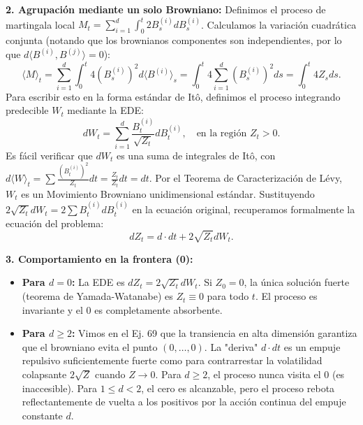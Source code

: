 \documentclass[11pt, letterpaper]{article}
\begin{document}
\begin{solucion}
    \textbf{2. Agrupación mediante un solo Browniano:}
    Definimos el proceso de martingala local $M_t = \sum_{i=1}^d \int_0^t 2 B_s^{(i)} dB_s^{(i)}$.
    Calculamos la variación cuadrática conjunta (notando que los brownianos componentes son independientes, por lo que $d\langle B^{(i)}, B^{(j)} \rangle = 0$):
    \[ \langle M \rangle_t = \sum_{i=1}^d \int_0^t 4 (B_s^{(i)})^2 d\langle B^{(i)} \rangle_s = \int_0^t 4 \sum_{i=1}^d (B_s^{(i)})^2 ds = \int_0^t 4 Z_s ds. \]
    Para escribir esto en la forma estándar de Itô, definimos el proceso integrando predecible $W_t$ mediante la EDE:
    \[ dW_t = \sum_{i=1}^d \frac{B_t^{(i)}}{\sqrt{Z_t}} dB_t^{(i)}, \quad \text{en la región } Z_t > 0. \]
    Es fácil verificar que $dW_t$ es una suma de integrales de Itô, con $d\langle W \rangle_t = \sum \frac{(B_t^{(i)})^2}{Z_t} dt = \frac{Z_t}{Z_t} dt = dt$.
    Por el Teorema de Caracterización de Lévy, $W_t$ es un Movimiento Browniano unidimensional estándar.
    Sustituyendo $2\sqrt{Z_t} dW_t = 2 \sum B_t^{(i)} dB_t^{(i)}$ en la ecuación original, recuperamos formalmente la ecuación del problema:
    \[ dZ_t = d \cdot dt + 2 \sqrt{Z_t} dW_t. \]

    \textbf{3. Comportamiento en la frontera (0):}
    \begin{itemize}
        \item \textbf{Para $d=0$:} La EDE es $dZ_t = 2\sqrt{Z_t}dW_t$. Si $Z_0 = 0$, la única solución fuerte (teorema de Yamada-Watanabe) es $Z_t \equiv 0$ para todo $t$. El proceso es invariante y el 0 es completamente absorbente.
        \item \textbf{Para $d \ge 2$:} Vimos en el Ej. 69 que la transiencia en alta dimensión garantiza que el browniano evita el punto $(0, \dots, 0)$. La "deriva" $d \cdot dt$ es un empuje repulsivo suficientemente fuerte como para contrarrestar la volatilidad colapsante $2\sqrt{Z}$ cuando $Z \to 0$. Para $d \ge 2$, el proceso nunca visita el $0$ (es inaccesible). Para $1 \le d < 2$, el cero es alcanzable, pero el proceso rebota reflectantemente de vuelta a los positivos por la acción continua del empuje constante $d$.
    \end{itemize}
\end{solucion}

\newpage
\end{document}
